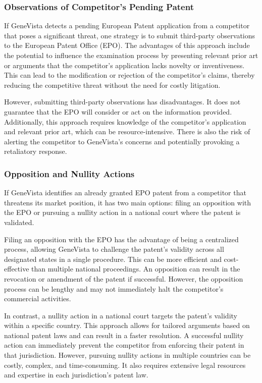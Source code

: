 \documentclass[a4paper]{article}
\begin{document}
\subsubsection{Observations of Competitor's Pending Patent}

If GeneVista detects a pending European Patent application from a competitor that poses a significant threat, one strategy is to submit third-party observations to the European Patent Office (EPO). The advantages of this approach include the potential to influence the examination process by presenting relevant prior art or arguments that the competitor's application lacks novelty or inventiveness. This can lead to the modification or rejection of the competitor's claims, thereby reducing the competitive threat without the need for costly litigation.

However, submitting third-party observations has disadvantages. It does not guarantee that the EPO will consider or act on the information provided. Additionally, this approach requires knowledge of the competitor’s application and relevant prior art, which can be resource-intensive. There is also the risk of alerting the competitor to GeneVista's concerns and potentially provoking a retaliatory response.

\subsubsection{Opposition and Nullity Actions}

If GeneVista identifies an already granted EPO patent from a competitor that threatens its market position, it has two main options: filing an opposition with the EPO or pursuing a nullity action in a national court where the patent is validated.

Filing an opposition with the EPO has the advantage of being a centralized process, allowing GeneVista to challenge the patent's validity across all designated states in a single procedure. This can be more efficient and cost-effective than multiple national proceedings. An opposition can result in the revocation or amendment of the patent if successful. However, the opposition process can be lengthy and may not immediately halt the competitor's commercial activities.

In contrast, a nullity action in a national court targets the patent's validity within a specific country. This approach allows for tailored arguments based on national patent laws and can result in a faster resolution. A successful nullity action can immediately prevent the competitor from enforcing their patent in that jurisdiction. However, pursuing nullity actions in multiple countries can be costly, complex, and time-consuming. It also requires extensive legal resources and expertise in each jurisdiction's patent law.
\end{document}
